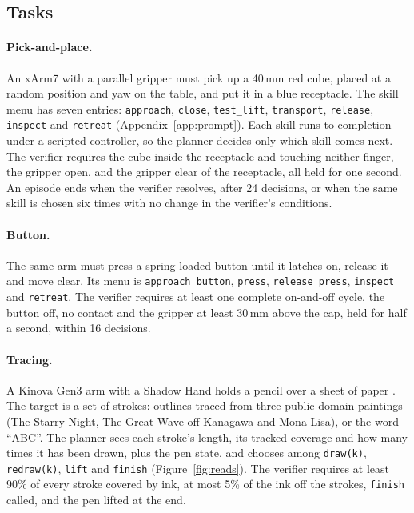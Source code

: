 \documentclass[11pt]{article}
\begin{document}
\subsection{Tasks}

\paragraph{Pick-and-place.} An xArm7 with a parallel gripper \citep{menagerie} must pick up a 40\,mm red cube, placed at a random position and yaw on the table, and put it in a blue receptacle. The skill menu has seven entries: \texttt{approach}, \texttt{close}, \texttt{test\_lift}, \texttt{transport}, \texttt{release}, \texttt{inspect} and \texttt{retreat} (Appendix~\ref{app:prompt}). Each skill runs to completion under a scripted controller, so the planner decides only which skill comes next. The verifier requires the cube inside the receptacle and touching neither finger, the gripper open, and the gripper clear of the receptacle, all held for one second. An episode ends when the verifier resolves, after 24 decisions, or when the same skill is chosen six times with no change in the verifier's conditions.

\paragraph{Button.} The same arm must press a spring-loaded button until it latches on, release it and move clear. Its menu is \texttt{approach\_button}, \texttt{press}, \texttt{release\_press}, \texttt{inspect} and \texttt{retreat}. The verifier requires at least one complete on-and-off cycle, the button off, no contact and the gripper at least 30\,mm above the cap, held for half a second, within 16 decisions.

\paragraph{Tracing.} A Kinova Gen3 arm with a Shadow Hand holds a pencil over a sheet of paper \citep{playground}. The target is a set of strokes: outlines traced from three public-domain paintings (The Starry Night, The Great Wave off Kanagawa and Mona Lisa), or the word ``ABC''. The planner sees each stroke's length, its tracked coverage and how many times it has been drawn, plus the pen state, and chooses among \texttt{draw(k)}, \texttt{redraw(k)}, \texttt{lift} and \texttt{finish} (Figure~\ref{fig:reads}). The verifier requires at least 90\% of every stroke covered by ink, at most 5\% of the ink off the strokes, \texttt{finish} called, and the pen lifted at the end.
\end{document}

